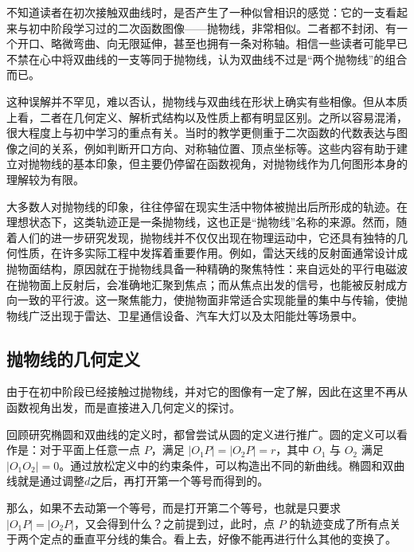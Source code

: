 
\begin{issues}
\issueDraft
\end{issues}


不知道读者在初次接触双曲线时，是否产生了一种似曾相识的感觉：它的一支看起来与初中阶段学习过的二次函数图像——抛物线，非常相似。二者都不封闭、有一个开口、略微弯曲、向无限延伸，甚至也拥有一条对称轴。相信一些读者可能早已不禁在心中将双曲线的一支等同于抛物线，认为双曲线不过是“两个抛物线”的组合而已。

这种误解并不罕见，难以否认，抛物线与双曲线在形状上确实有些相像。但从本质上看，二者在几何定义、解析式结构以及性质上都有明显区别。之所以容易混淆，很大程度上与初中学习的重点有关。当时的教学更侧重于二次函数的代数表达与图像之间的关系，例如判断开口方向、对称轴位置、顶点坐标等。这些内容有助于建立对抛物线的基本印象，但主要仍停留在函数视角，对抛物线作为几何图形本身的理解较为有限。

大多数人对抛物线的印象，往往停留在现实生活中物体被抛出后所形成的轨迹。在理想状态下，这类轨迹正是一条抛物线，这也正是“抛物线”名称的来源。然而，随着人们的进一步研究发现，抛物线并不仅仅出现在物理运动中，它还具有独特的几何性质，在许多实际工程中发挥着重要作用。例如，雷达天线的反射面通常设计成抛物面结构，原因就在于抛物线具备一种精确的聚焦特性：来自远处的平行电磁波在抛物面上反射后，会准确地汇聚到焦点；而从焦点出发的信号，也能被反射成方向一致的平行波。这一聚焦能力，使抛物面非常适合实现能量的集中与传输，使抛物线广泛出现于雷达、卫星通信设备、汽车大灯以及太阳能灶等场景中。

\subsection{抛物线的几何定义}

由于在初中阶段已经接触过抛物线，并对它的图像有一定了解，因此在这里不再从函数视角出发，而是直接进入几何定义的探讨。

回顾研究椭圆和双曲线的定义时，都曾尝试从圆的定义进行推广。圆的定义可以看作是：对于平面上任意一点 $P$，满足 $|O_1P| = |O_2P| = r$，其中 $O_1$ 与 $O_2$ 满足$|O_1O_2|=0$。通过放松定义中的约束条件，可以构造出不同的新曲线。椭圆和双曲线就是通过调整$d$之后，再打开第一个等号而得到的。

那么，如果不去动第一个等号，而是打开第二个等号，也就是只要求 $|O_1P| = |O_2P|$，又会得到什么？之前提到过，此时，点 $P$ 的轨迹变成了所有点关于两个定点的垂直平分线的集合。看上去，好像不能再进行什么其他的变换了。

